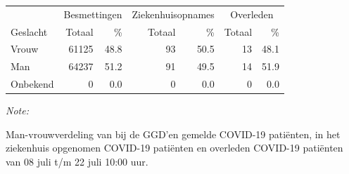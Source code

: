 \documentclass[
  english,
  man,floatsintext]{apa6}
\begin{document}
\begin{table}
\centering\begingroup\fontsize{11}{13}\selectfont

\begin{threeparttable}
\begin{tabular}{lrrrrrr}
\toprule
\multicolumn{1}{c}{ } & \multicolumn{2}{c}{Besmettingen} & \multicolumn{2}{c}{Ziekenhuisopnames} & \multicolumn{2}{c}{Overleden} \\
\cmidrule(l{3pt}r{3pt}){2-3} \cmidrule(l{3pt}r{3pt}){4-5} \cmidrule(l{3pt}r{3pt}){6-7}
Geslacht & Totaal & \% & Totaal & \% & Totaal & \%\\
\midrule
Vrouw & 61125 & 48.8 & 93 & 50.5 & 13 & 48.1\\
Man & 64237 & 51.2 & 91 & 49.5 & 14 & 51.9\\
Onbekend & 0 & 0.0 & 0 & 0.0 & 0 & 0.0\\
\bottomrule
\end{tabular}
\begin{tablenotes}
\item \textit{Note: } 
\item Man-vrouwverdeling van bij de GGD’en gemelde COVID-19 patiënten, in het ziekenhuis opgenomen COVID-19 patiënten en overleden COVID-19 patiënten van 08 juli t/m 22 juli 10:00 uur.
\end{tablenotes}
\end{threeparttable}
\endgroup{}
\end{table}
\newpage
\end{document}
